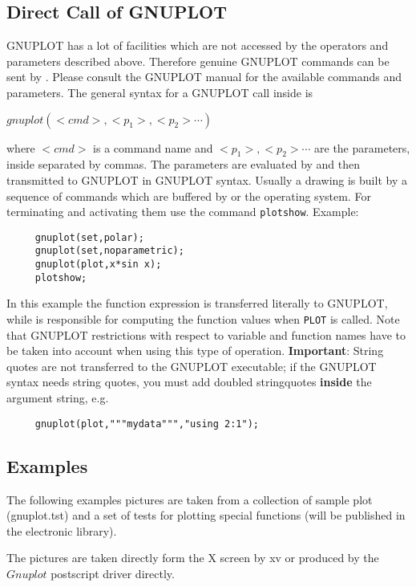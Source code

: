 \subsection{Direct Call of GNUPLOT}

GNUPLOT has a lot of facilities which are not accessed by
the operators and parameters described above. Therefore
genuine GNUPLOT commands can be sent by {\REDUCE}.
Please consult the GNUPLOT manual for the available
commands and parameters. The general syntax for a GNUPLOT call
inside {\REDUCE} is

    $gnuplot(<cmd>,<p_1>,<p_2> \cdots)$

where $<cmd>$ is a command name and $<p_1>,<p_2> \cdots$
are the parameters, inside {\REDUCE} separated by
commas. The parameters are evaluated by
{\REDUCE} and then transmitted to GNUPLOT in
GNUPLOT syntax. Usually a drawing is built by a
sequence of commands which are buffered 
by {\REDUCE} or the operating
system. For terminating and activating them use the {\REDUCE}
command \verb+plotshow+. Example:
\begin{verbatim}
     gnuplot(set,polar);
     gnuplot(set,noparametric);
     gnuplot(plot,x*sin x);
     plotshow;
\end{verbatim}
In this example the function expression is transferred literally
to GNUPLOT, while {\REDUCE}
is responsible for computing the function values when \verb+PLOT+ is called.
Note that GNUPLOT restrictions with respect to variable
and function names have to be taken into account when
using this type of operation. {\bf Important}: String quotes are
not transferred to the GNUPLOT executable; if the GNUPLOT syntax
needs string quotes, you must add doubled stringquotes  {\bf inside}
the argument string, e.g.
\begin{verbatim}
     gnuplot(plot,"""mydata""","using 2:1");
\end{verbatim}

\subsection{Examples}

The following examples pictures are taken from a collection of sample
plot (gnuplot.tst) and a set of tests for plotting special functions
(will be published in the {\REDUCE} electronic library).

The pictures are taken directly form the X screen by xv or 
produced by the $Gnuplot$ postscript driver directly.

